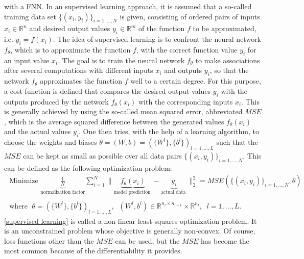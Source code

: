 with a FNN. In an supervised learning approach, it is assumed that a so-called training data set $\{ (x_i, y_i) \}_{i = 1, \ldots, N}$ is given, consisting of ordered pairs of inputs $x_i \in \mathbb{R}^n$ and desired output values $y_i \in \mathbb{R}^m$ of the function $f$ to be approximated, i.e. $y_i = f(x_i)$. The idea of supervised learning is to confront the neural network $f_{\theta}$, which is to approximate the function $f$, with the correct function value $y_i$ for an input value $x_i$. The goal is to train the neural network $f_{\theta}$ to make associations after several computations with different inputs $x_i$ and outputs $y_i$, so that the network $f_{\theta}$ approximates the function $f$ well to a certain degree. For this purpose, a cost function is defined that compares the desired output values $y_i$ with the outputs produced by the network $f_{\theta}(x_i)$ with the corresponding inputs $x_i$. This is generally achieved by using the so-called mean squared error, abbreviated $MSE$, which is the average squared difference between the generated values $f_{\theta}(x_i)$ and the actual values $y_i$. One then tries, with the help of a learning algorithm, to choose the weights and biases $\theta = (W, b) = (\{ W^l \}, \{ b^l \})_{l = 1, \ldots, L}$ such that the $MSE$ can be kept as small as possible over all data pairs $\{ (x_i, y_i) \}_{i = 1, \ldots, N}$. This can be defined as the following optimization problem:
\begin{equation}
    \label{supervised learning}
    \begin{gathered}
        \text{ Minimize } \underbrace{\frac{1}{N}}_{\text{normalization factor}} \sum_{i=1}^{N} \lVert \underbrace{ f_{\theta} \left(x_{i}\right)}_{\text{model prediction }} - \underbrace{y_{i}}_{\text{actual data }} \rVert^{2}_2 =  MSE(\{ (x_i, y_i) \}_{i = 1, \ldots, N}, \theta) \\
        \\
        \text{ where } \; \theta = (\{ W^l \}, \{ b^l \})_{l = 1, \ldots, L}, \; \; \left(W^{l}, b^{l}\right) \in \mathbb{R}^{n_l \times n_{l-1}} \times \mathbb{R}^{n_l}, \; \; l=1, \ldots, L .
    \end{gathered}
\end{equation}
\cref{supervised learning} is called a non-linear least-squares optimization problem. It is an unconstrained problem whose objective is generally non-convex. Of course, loss functions other than the $MSE$ can be used, but the $MSE$ has become the most common because of the differentiability it provides. \\
